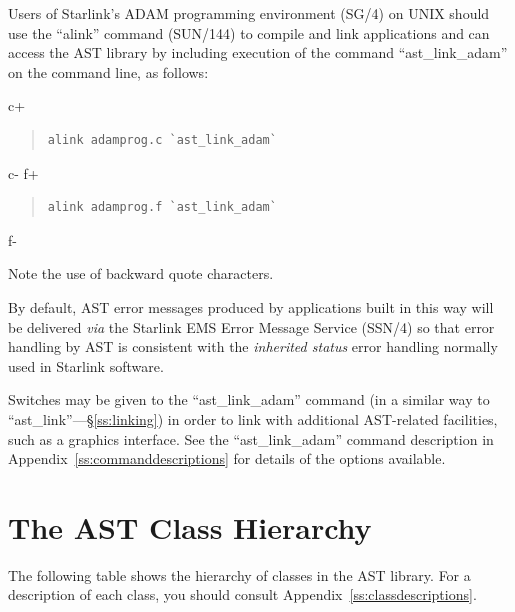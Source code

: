 \documentclass[twoside,11pt]{article}
\newcommand{\xref}[3]{#1}
\newcommand{\latex}[1]{#1}
\newcommand{\appref}[1]{Appendix~\ref{#1}}
\newcommand{\secref}[1]{\S\ref{#1}}
\newcommand{\appref}[1]{\ref{#1}}
\newcommand{\secref}[1]{\ref{#1}}
\begin{document}
Users of Starlink's \xref{ADAM}{sg4}{} programming environment
\latex{(SG/4)} on UNIX should use the
``\xref{alink}{sun144}{ADAM_link_scripts}'' command
(\xref{SUN/144}{sun144}{}) to compile and link applications and can
access the AST library by including execution of the command
``ast\_link\_adam'' on the command line, as follows:

c+
\begin{quote}
\small
\begin{verbatim}
alink adamprog.c `ast_link_adam`
\end{verbatim}
\normalsize
\end{quote}
c-
f+
\begin{quote}
\small
\begin{verbatim}
alink adamprog.f `ast_link_adam`
\end{verbatim}
\normalsize
\end{quote}
f-

Note the use of backward quote characters.

By default, AST error messages produced by applications built in this
way will be delivered {\em{via}} the Starlink EMS Error Message
Service (\xref{SSN/4}{ssn4}{}) so that error handling by AST is
consistent with the \xref{{\em{inherited
status}}}{sun104}{inherited_status} error handling normally used in
Starlink software.

Switches may be given to the ``ast\_link\_adam'' command (in a similar
way to ``ast\_link''---\secref{ss:linking}) in order to link with
additional AST-related facilities, such as a graphics interface. See
the ``ast\_link\_adam'' command description in
\appref{ss:commanddescriptions} for details of the options available.

\appendix
\cleardoublepage
\section{\label{ss:classhierarchy}The AST Class Hierarchy}
The following table shows the hierarchy of classes in the AST library.
For a description of each class, you should consult
\appref{ss:classdescriptions}.
\end{document}
